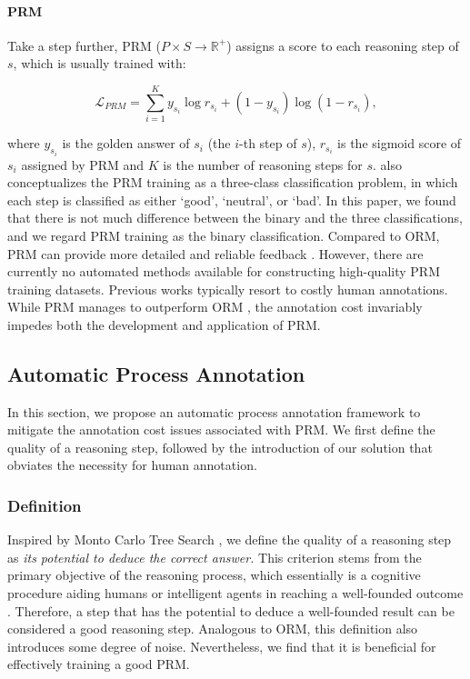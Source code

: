 \paragraph{PRM} Take a step further, PRM ($P \times S \to \mathbb{R}^{+}$) assigns a score to each reasoning step of $s$, which is usually trained with:

\begin{equation}
    \mathcal{L}_{PRM} = \sum_{i=1}^K y_{s_i} \log r_{s_i}+ (1 - y_{s_i}) \log (1 - r_{s_i}),
    \label{eq:prm}
\end{equation}

where $y_{s_i}$ is the golden answer of $s_i$ (the $i$-th step of $s$), $r_{s_i}$ is the sigmoid score of $s_i$ assigned by PRM and $K$ is the number of reasoning steps for $s$. \citep{lightman2023let} also conceptualizes the PRM training as a three-class classification problem, in which each step is classified as either `good', `neutral', or `bad'. In this paper, we found that there is not much difference between the binary and the three classifications, and we regard PRM training as the binary classification. Compared to ORM, PRM can provide more detailed and reliable feedback \citep{lightman2023let}. However, there are currently no automated methods available for constructing high-quality PRM training datasets. Previous works \citep{uesato2022solving,lightman2023let} typically resort to costly human annotations. While PRM manages to outperform ORM \citep{lightman2023let}, the annotation cost invariably impedes both the development and application of PRM.

\subsection{Automatic Process Annotation}
\label{subsec:apa}
In this section, we propose an automatic process annotation framework to mitigate the annotation cost issues associated with PRM. We first define the quality of a reasoning step, followed by the introduction of our solution that obviates the necessity for human annotation.

\subsubsection{Definition} Inspired by Monto Carlo Tree Search \citep{kocsis2006bandit,coulom2006efficient,silver2016mastering,swiechowski2023monte}, we define the quality of a reasoning step as \textit{its potential to deduce the correct answer.} This criterion stems from the primary objective of the reasoning process, which essentially is a cognitive procedure aiding humans or intelligent agents in reaching a well-founded outcome \citep{huang-chang-2023-towards}. Therefore, a step that has the potential to deduce a well-founded result can be considered a good reasoning step.  Analogous to ORM, this definition also introduces some degree of noise. Nevertheless, we find that it is beneficial for effectively training a good PRM.


